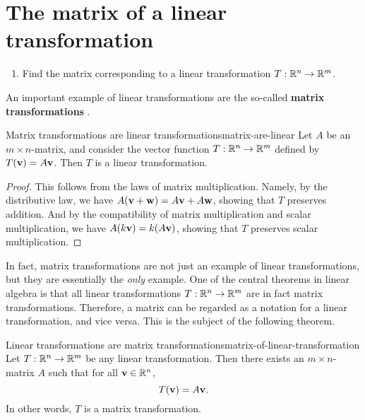 \section{The matrix of a linear transformation}

\begin{outcome}
  \begin{enumerate}
  \item Find the matrix corresponding to a linear transformation
    $T:\mathbb{R}^n\to\mathbb{R}^m$.
  \end{enumerate}
\end{outcome}

An important example of linear transformations are the so-called
\textbf{matrix transformations}%
%
.

\begin{proposition}{Matrix transformations are linear transformations}{matrix-are-linear}
  Let $A$ be an $m\times n$-matrix, and consider the vector function
  $T:\mathbb{R}^{n}\to \mathbb{R}^{m}$ defined by $T(\mbox{\bf v}) = A\mbox{\bf v}$. Then $T$
  is a linear transformation.
\end{proposition}

\begin{proof}
  This follows from the laws of matrix multiplication. Namely, by the
  distributive law, we have
  $A(\mbox{\bf v}+\mbox{\bf w}) = A\mbox{\bf v} + A\mbox{\bf w}$, showing that $T$
  preserves addition. And by the compatibility of matrix multiplication
  and scalar multiplication, we have $A(k\mbox{\bf v}) = k(A\mbox{\bf v})$,
  showing that $T$ preserves scalar multiplication.
\end{proof}

In fact, matrix transformations are not just an example of linear
transformations, but they are essentially the {\em only} example. One
of the central theorems in linear algebra is that all linear
transformations $T:\mathbb{R}^n\to\mathbb{R}^m$ are in fact matrix transformations.
Therefore, a matrix can be regarded as a notation for a linear
transformation, and vice versa. This is the subject of the following
theorem.

\begin{theorem}{Linear transformations are matrix transformations}{matrix-of-linear-transformation}
  Let $T:\mathbb{R}^n\to\mathbb{R}^m$ be any linear transformation. Then there exists
  an $m\times n$-matrix $A$ such that for all $\mbox{\bf v}\in\mathbb{R}^n$,
  \begin{equation*}
    T(\mbox{\bf v}) = A\mbox{\bf v}.
  \end{equation*}
  In other words, $T$ is a matrix transformation.
\end{theorem}

